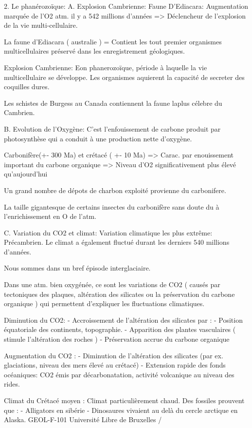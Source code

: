 2. Le phanérozoïque:
A. Explosion Cambrienne: Faune D’Ediacara:
Augmentation marquée de l’O2 atm. il y a 542 millions d’années
=> Déclencheur de l’explosion de la vie multi-cellulaire.


La faune d’Ediacara ( australie ) = Contient les tout premier organismes multicellulaires préservé dans les enregistrement géologiques.


Explosion Cambrienne:
Eon phanerozoïque, période à laquelle la vie multicellulaire se développe.
Les organismes aquierent la capacité de secreter des coquilles dures.


Les schistes de Burgess au Canada contiennent la faune laplus célebre du Cambrien.


B. Evolution de l’Oxygène:
C’est l’enfouissement de carbone produit par photosynthèse qui a conduit à une production nette d’oxygène.


Carbonifère(+- 300 Ma) et crétacé ( +- 10 Ma) => Carac. par enouissement important du carbone organique => Niveau d’O2 significativement plus élevé qu’aujourd’hui


Un grand nombre de dépots de charbon exploité provienne du carbonifere.


La taille gigantesque de certains insectes du carbonifère sans doute du à l’enrichissement en O de l’atm.




C. Variation du CO2 et climat:
Variation climatique les plus extrême: Précambrien.
Le climat a également fluctué durant les derniers 540 millions d’années.


Nous sommes dans un bref épisode interglaciaire.


Dans une atm. bien oxygénée, ce sont les variations de CO2 ( causés par tectoniques des plaques, altération des silicates ou la préservation du carbone organique ) qui permettent d’expliquer les fluctuations climatiques.


  



Diminution du CO2:
- Accroissement de l’altération des silicates par :
        - Position équatoriale des continents, topographie.
        - Apparition des plantes vasculaires ( stimule l’altération des roches )
- Préservation accrue du carbone organique


Augmentation du CO2 :
- Diminution de l’altération des silicates (par ex. glaciations, niveau des mers élevé au crétacé)
- Extension rapide des fonds océaniques: CO2 émis par décarbonatation, activité volcanique au niveau des rides.




Climat du Crétacé moyen :
Climat particulièrement chaud.
Des fossiles prouvent que :
        - Alligators en sibérie
        - Dinosaures vivaient au delà du cercle arctique en Alaska.
GEOL-F-101        Université Libre de Bruxelles         /
